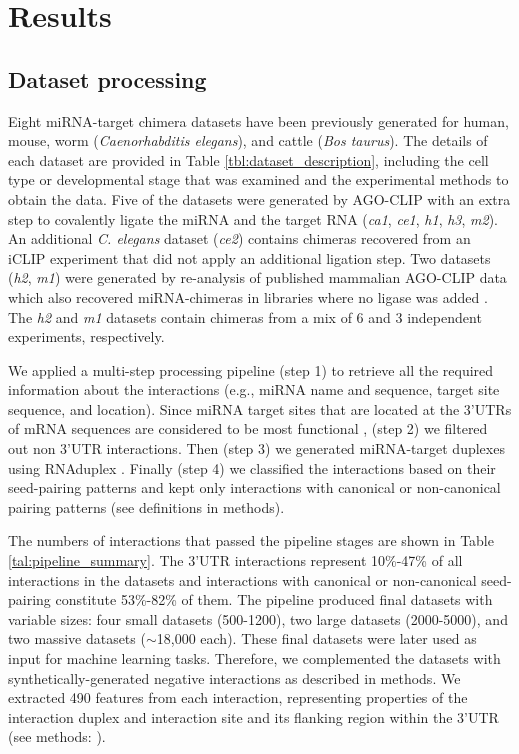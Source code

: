 \documentclass{bmcart}
\begin{document}

\clearpage
\section*{Results}
\subsection*{Dataset processing}
Eight miRNA-target chimera datasets have been previously generated for human, mouse, worm (\textit{Caenorhabditis elegans}), and cattle (\textit{Bos taurus}).
The details of each dataset are provided in Table \ref{tbl:dataset_description}, including the cell type or developmental stage that was examined and the experimental methods to obtain the data. Five of the datasets were generated by AGO-CLIP with an extra step to covalently ligate the miRNA and the target RNA (\textit{ca1}, \textit{ce1}, \textit{h1},  \textit{h3}, \textit{m2}). An additional \textit{C. elegans} dataset (\textit{ce2}) contains chimeras recovered from an iCLIP experiment that did not apply an additional ligation step. Two datasets (\textit{h2}, \textit{m1}) were generated by re-analysis of published mammalian AGO-CLIP data which also recovered miRNA-chimeras in libraries where no ligase was added \cite{grosswendt2014unambiguous}. The \textit{h2} and \textit{m1} datasets contain chimeras from a mix of 6 and 3 independent experiments, respectively.



We applied a multi-step processing pipeline (step 1) to retrieve all the required information about the interactions (e.g., miRNA name and sequence, target site sequence, and location). Since miRNA target sites that are located at the 3’UTRs of mRNA sequences are considered to be most functional \cite{menor2014mirmark, baek2008impact}, (step 2) we filtered out non 3'UTR interactions. Then (step 3) we generated miRNA-target duplexes using RNAduplex \cite{lorenz2011viennarna}. Finally (step 4) we classified the interactions based on their seed-pairing patterns and kept only interactions with canonical or non-canonical pairing patterns (see definitions in methods). 


The numbers of interactions that passed the pipeline stages are shown in Table \ref{tal:pipeline_summary}. The 3'UTR interactions represent 10\%-47\% of all interactions in the datasets and interactions with canonical or non-canonical seed-pairing constitute 53\%-82\% of them. The pipeline produced final datasets with variable sizes: four small datasets (500-1200), two large datasets (2000-5000), and two massive datasets ($\sim$18,000 each). These final datasets were later used as input for machine learning tasks. Therefore, we complemented the datasets with synthetically-generated negative interactions as described in methods. We extracted 490 features from each interaction, representing properties of the interaction duplex and interaction site and its flanking region within the 3'UTR (see methods: ).
\end{document}
